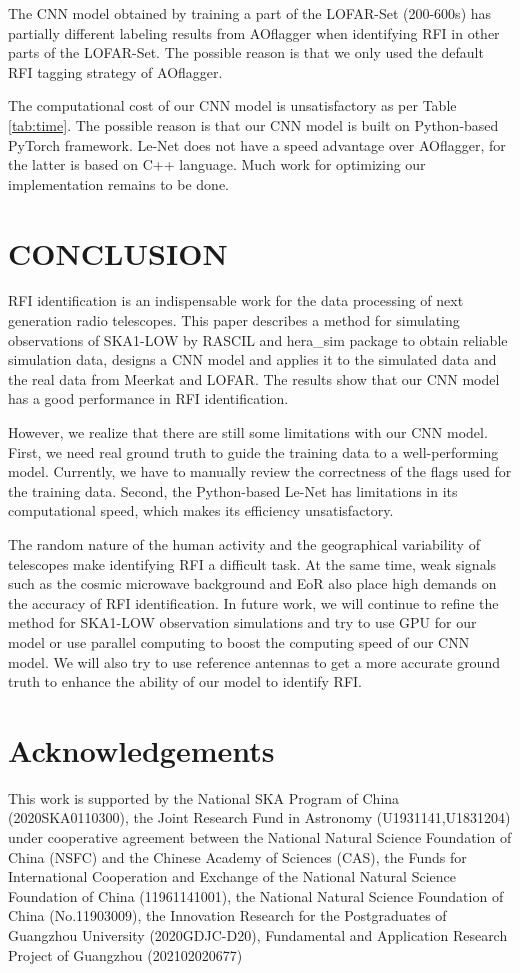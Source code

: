 \documentclass[usenatbib]{mnras}
\begin{document}
The CNN model obtained by training a part of the LOFAR-Set (200-600s) has partially different labeling results from AOflagger when identifying RFI in other parts of the LOFAR-Set. The possible reason is that we only used the default RFI tagging strategy of AOflagger.

The computational cost of our CNN model is unsatisfactory as per Table \ref{tab:time}. The possible reason is that our CNN model is built on Python-based PyTorch framework\citep{paszke2019pytorch}. Le-Net does not have a speed advantage over AOflagger, for the latter is based on C++ language. Much work for optimizing our implementation remains to be done. 


\section{CONCLUSION}
\label{6}
RFI identification is an indispensable work for the data processing of next generation radio telescopes. This paper describes a method for simulating observations of SKA1-LOW by RASCIL and hera\_sim package to obtain reliable simulation data, designs a CNN model and applies it to the simulated data and the real data from Meerkat and LOFAR. The results show that our CNN model has a good performance in RFI identification. 

However, we realize that there are still some limitations with our CNN model. First, we need real ground truth to guide the training data to a well-performing model. Currently, we have to manually review the correctness of the flags used for the training data. Second, the Python-based Le-Net has limitations in its computational speed, which makes its efficiency unsatisfactory.

The random nature of the human activity and the geographical variability of telescopes make identifying RFI a difficult task. At the same time, weak signals such as the cosmic microwave background and EoR also place high demands on the accuracy of RFI identification. In future work, we will continue to refine the method for SKA1-LOW observation simulations and try to use GPU for our model or use parallel computing to boost the computing speed of our CNN model. We will also try to use reference antennas to get a more accurate ground truth to enhance the ability of our model to identify RFI.


\section*{Acknowledgements}
This work is supported by the National SKA Program of China (2020SKA0110300), the Joint Research Fund in Astronomy (U1931141,U1831204) under cooperative agreement between the National Natural Science Foundation of China (NSFC) and the Chinese Academy of Sciences (CAS), the Funds for International Cooperation and Exchange of the National Natural Science Foundation of China (11961141001), the National Natural Science Foundation of China (No.11903009),
the Innovation Research for the Postgraduates of Guangzhou University (2020GDJC-D20), Fundamental and Application Research Project of Guangzhou (202102020677)
\end{document}
